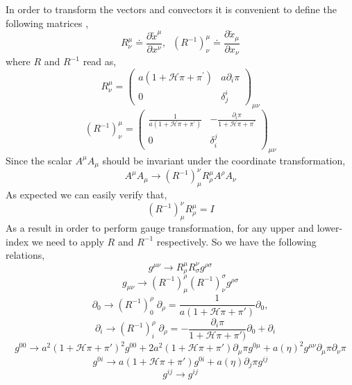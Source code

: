 \documentclass[a4paper,11pt]{article}
\def\be{\begin{equation}}
\def\ee{\end{equation}}
\newcommand{\HH}{\mathcal H}
\begin{document}
In order to transform the vectors and convectors it is convenient to define the following matrices  \cite{Lewandowski:2016yce},
\begin{equation}
R_{\nu}^{\mu} \doteq \frac{\partial \tilde{x}^{\mu}}{\partial x^{\nu}}, \; \; (R^{-1})_{\nu}^{\mu} \doteq \frac{\partial \tilde{x}_{\mu}}{\partial x_{\nu}}
\end{equation}
where $R$ and $R^{-1}$ read as,
\begin{equation}
R_{\nu}^{\mu}=\left(\begin{array}{cc}
a(1+\HH \pi+\pi^{\prime}) & a \partial_{i} \pi \\
0 & \delta_{j}^{i}
\end{array}\right)_{\mu \nu}
\end{equation}
\begin{equation}
(R^{-1})_{\nu}^{\mu} =
\left(\begin{array}{cc}
  \frac{1}{a(1+\HH \pi+\pi^{\prime})} & - \frac{ \partial_{i} \pi}{1+ \HH \pi+\pi^{\prime}} \\
0 & \delta_{i}^{j}
\end{array}\right)_{\mu \nu}
\end{equation}
Since the scalar $A^{\mu} A_{\mu}$ should be invariant under the coordinate transformation,
\be
A^{\mu} A_{\mu} \rightarrow  (R^{-1})_{\mu}^{\nu} R_{\rho}^{\mu} A^{\rho} A_{\nu}
\ee
As expected we can easily verify that,
\be
(R^{-1})_{\mu}^{\nu} R_{\rho}^{\mu} = I
\ee
As a result in order to perform gauge transformation, for any upper and lower-index we need to apply $R$  and $R^{-1}$ respectively. So we have the following relations,
\begin{equation}
g^{\mu \nu} \rightarrow R_{\rho}^{\mu} R_{\sigma}^{\nu} g^{\rho \sigma}
\end{equation}
\begin{equation}
g_{\mu \nu} \rightarrow (R^{-1})^{\rho}_{\mu}(R^{-1})^{\sigma}_{\nu} g^{\rho \sigma}
\end{equation}
\begin{equation}
\partial_{0} \rightarrow   (R^{-1})^{\rho}_{0}  \; \partial_{\rho} = \frac{1}{a (1+ \HH \pi + \pi')} \partial_{0}, 
\end{equation}
\begin{equation}
\quad \partial_{i} \rightarrow  (R^{-1})^{\rho}_{i} \; \partial_{\rho}  = -\frac{ \partial_{i} \pi}{1+ \HH \pi + \pi')} \partial_{0}+\partial_{i}
\end{equation}
\begin{equation}
g^{00} \rightarrow a^2 (1+ \HH \pi +  \pi')^2 g^{00}+2 a^2 (1+  \HH \pi +  \pi')  \partial_{\mu} \pi  g^{0 \mu}+ a(\eta)^2 g^{\mu \nu} \partial_{\mu} \pi \partial_{\nu} \pi
\end{equation}
\begin{equation}
g^{0i} \rightarrow a(1+\HH \pi + \pi') g^{0i}+a(\eta) \partial_{j} \pi  g^{i j}
\end{equation}
\begin{equation}
g^{ij} \rightarrow g^{ij}
\end{equation}
\end{document}
